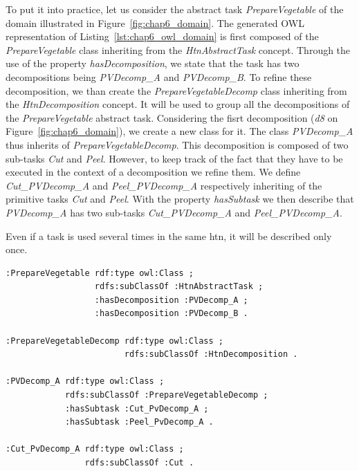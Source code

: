 To put it into practice, let us consider the abstract task \textit{PrepareVegetable} of the domain illustrated in Figure~\ref{fig:chap6_domain}. The generated OWL representation of Listing~\ref{lst:chap6_owl_domain} is first composed of the \textit{PrepareVegetable} class inheriting from the \textit{HtnAbstractTask} concept. Through the use of the property \textit{hasDecomposition}, we state that the task has two decompositions being \textit{PVDecomp\_A} and \textit{PVDecomp\_B}. To refine these decomposition, we than create the \textit{PrepareVegetableDecomp} class inheriting from the \textit{HtnDecomposition} concept. It will be used to group all the decompositions of the \textit{PrepareVegetable} abstract task. Considering the fisrt decomposition (\textit{d8} on Figure~\ref{fig:chap6_domain}), we create a new class for it. The class \textit{PVDecomp\_A} thus inherits of \textit{PrepareVegetableDecomp}. This decomposition is composed of two sub-tasks \textit{Cut} and \textit{Peel}. However, to keep track of the fact that they have to be executed in the context of a decomposition we refine them. We define \textit{Cut\_PVDecomp\_A} and \textit{Peel\_PVDecomp\_A} respectively inheriting of the primitive tasks \textit{Cut} and \textit{Peel}. With the property \textit{hasSubtask} we then describe that \textit{PVDecomp\_A} has two sub-tasks \textit{Cut\_PVDecomp\_A} and \textit{Peel\_PVDecomp\_A}.

Even if a task is used several times in the same \acrshort{htn}, it will be described only once.

\begin{lstlisting}[frame=single, basicstyle=\scriptsize\ttfamily, label={lst:chap6_owl_domain}, caption={Description of the abstract task PrepareVegetable and one of its decomposition in the OWL language using the Turle syntax.},captionpos=b, style=OwlTurtle]
:PrepareVegetable rdf:type owl:Class ;
                  rdfs:subClassOf :HtnAbstractTask ;
                  :hasDecomposition :PVDecomp_A ;
                  :hasDecomposition :PVDecomp_B .

:PrepareVegetableDecomp rdf:type owl:Class ;
                        rdfs:subClassOf :HtnDecomposition .

:PVDecomp_A rdf:type owl:Class ;
            rdfs:subClassOf :PrepareVegetableDecomp ;
            :hasSubtask :Cut_PvDecomp_A ;
            :hasSubtask :Peel_PvDecomp_A .

:Cut_PvDecomp_A rdf:type owl:Class ;
                rdfs:subClassOf :Cut .
\end{lstlisting}

